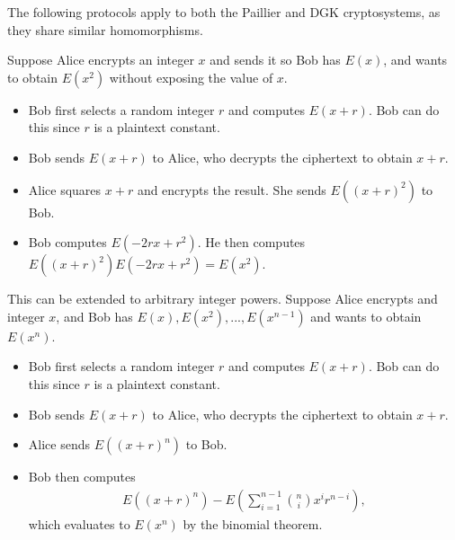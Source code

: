 The following protocols apply to both the Paillier and DGK cryptosystems, as they share similar homomorphisms.

Suppose Alice encrypts an integer $x$ and sends it so Bob has $E(x)$, and wants to obtain $E(x^2)$ without exposing the value of $x$.
\begin{itemize}
	\item Bob first selects a random integer $r$ and computes $E(x+r)$. Bob can do this since $r$ is a plaintext constant.
	\item Bob sends $E(x+r)$ to Alice, who decrypts the ciphertext to obtain $x+r$.
	\item Alice squares $x+r$ and encrypts the result. She sends $E((x+r)^2)$ to Bob.
	\item Bob computes $E(-2rx + r^2)$. He then computes $E((x+r)^2)E(-2rx + r^2) = E(x^2)$.
\end{itemize}

This can be extended to arbitrary integer powers.
Suppose Alice encrypts and integer $x$, and Bob has $E(x), E(x^2), ..., E(x^{n-1})$ and wants to obtain $E(x^n)$.
\begin{itemize}
	\item Bob first selects a random integer $r$ and computes $E(x+r)$. Bob can do this since $r$ is a plaintext constant.
	\item Bob sends $E(x+r)$ to Alice, who decrypts the ciphertext to obtain $x+r$.
	\item Alice sends $E((x+r)^n)$ to Bob.
	\item Bob then computes
	\begin{align*}
		E((x+r)^n) - E\left(\sum_{i=1}^{n-1}{\binom{n}{i}x^ir^{n-i}}\right),
	\end{align*}
	which evaluates to $E(x^n)$ by the binomial theorem.
\end{itemize}
